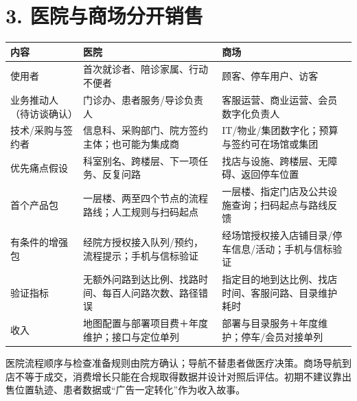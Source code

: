 \documentclass[UTF8,10pt,fontset=fandol]{ctexart}
\begin{document}
\section*{3. 医院与商场分开销售}
\begingroup\small\begin{longtable}{>{\raggedright\arraybackslash}p{}>{\raggedright\arraybackslash}p{}>{\raggedright\arraybackslash}p{}}
\textbf{内容} & \textbf{医院} & \textbf{商场}\\\hline\endhead
使用者 & 首次就诊者、陪诊家属、行动不便者 & 顾客、停车用户、访客\\\hline
业务推动人（待访谈确认） & 门诊办、患者服务/导诊负责人 & 客服运营、商业运营、会员数字化负责人\\\hline
技术/采购与签约者 & 信息科、采购部门、院方签约主体；也可能为集成商 & IT/物业/集团数字化；预算与签约可在场馆或集团\\\hline
优先痛点假设 & 科室别名、跨楼层、下一项任务、反复问路 & 找店与设施、跨楼层、无障碍、返回停车位置\\\hline
首个产品包 & 一层楼、两至四个节点的流程路线；人工规则与扫码起点 & 一层楼、指定门店及公共设施查询；扫码起点与路线反馈\\\hline
有条件的增强包 & 经院方授权接入队列/预约，流程提示；手机与信标验证 & 经场馆授权接入店铺目录/停车信息/活动；手机与信标验证\\\hline
验证指标 & 无额外问路到达比例、找路时间、每百人问路次数、路径错误 & 指定目的地到达比例、找店时间、客服问路、目录维护耗时\\\hline
收入 & 地图配置与部署项目费＋年度维护；接口与定位单列 & 部署与目录服务＋年度维护；停车/会员对接单列\\\hline
\end{longtable}\endgroup
医院流程顺序与检查准备规则由院方确认；导航不替患者做医疗决策。商场导航到店不等于成交，消费增长只能在合规取得数据并设计对照后评估。初期不建议靠出售位置轨迹、患者数据或“广告一定转化”作为收入故事。\par
\end{document}
